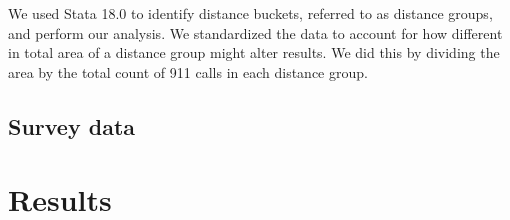 \documentclass[12pt]{article}
\begin{document}
We used Stata 18.0 to identify distance buckets, referred to as distance groups, and perform our analysis. We standardized the data to account for how different in total area of a distance group might alter results. We did this by dividing the area by the total count of 911 calls in each distance group. 


\subsection{Survey data}

\section{Results}
\label{sec:result}
\end{document}
